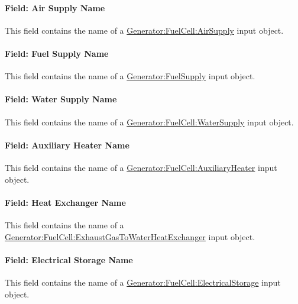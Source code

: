 \paragraph{Field: Air Supply Name}\label{field-air-supply-name}

This field contains the name of a \hyperref[generatorfuelcellairsupply]{Generator:FuelCell:AirSupply} input object.

\paragraph{Field: Fuel Supply Name}\label{field-fuel-supply-name}

This field contains the name of a \hyperref[generatorfuelsupply]{Generator:FuelSupply} input object.

\paragraph{Field: Water Supply Name}\label{field-water-supply-name}

This field contains the name of a \hyperref[generatorfuelcellwatersupply]{Generator:FuelCell:WaterSupply} input object.

\paragraph{Field: Auxiliary Heater Name}\label{field-auxiliary-heater-name}

This field contains the name of a \hyperref[generatorfuelcellauxiliaryheater]{Generator:FuelCell:AuxiliaryHeater} input object.

\paragraph{Field: Heat Exchanger Name}\label{field-heat-exchanger-name-000}

This field contains the name of a \hyperref[generator-fuelcell-exhaustgastowaterheatexchanger]{Generator:FuelCell:ExhaustGasToWaterHeatExchanger} input object.

\paragraph{Field: Electrical Storage Name}\label{field-electrical-storage-name}

This field contains the name of a \hyperref[generatorfuelcellelectricalstorage]{Generator:FuelCell:ElectricalStorage} input object.

